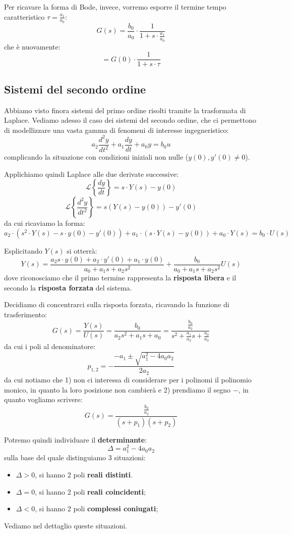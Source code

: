 \documentclass[a4paper,11pt]{article}
\begin{document}
Per ricavare la forma di Bode, invece, vorremo esporre il termine tempo caratteristico $\tau = \frac{a_1}{a_0}$:
$$
G(s) = \frac{b_0}{a_0} \cdot \frac{1}{1 + s \cdot \frac{a_1}{a_0}}
$$
che è nuovamente:
$$
= G(0) \cdot \frac{1}{1 + s \cdot \tau}
$$

\subsection{Sistemi del secondo ordine}
Abbiamo visto finora sistemi del primo ordine risolti tramite la trasformata di Laplace.
Vediamo adesso il caso dei sistemi del secondo ordine, che ci permettono di modellizzare una vasta gamma di fenomeni di interesse ingegneristico:
$$
a_2 \frac{d^2 y}{dt^2} + a_1 \frac{dy}{dt} + a_0 y = b_0 u
$$
complicando la situazione con condizioni iniziali non nulle ($y(0), y'(0) \neq 0$).

Applichiamo quindi Laplace alle due derivate successive:
$$
\mathcal{L} \left\{ \frac{dy}{dt} \right\} = s \cdot Y(s) - y(0)
$$
$$
\mathcal{L} \left\{ \frac{d^2y}{dt^2} \right\} = s \left( Y(s) - y(0) \right) - y'(0)
$$
da cui ricaviamo la forma:
$$
a_2 \cdot \left( s^2 \cdot Y(s) - s \cdot y(0) - y'(0) \right) + a_1 \cdot \left( s \cdot Y(s) - y(0) \right) + a_0 \cdot Y(s) = b_0 \cdot U(s)
$$

Esplicitando $Y(s)$ si otterrà:
$$
Y(s) = \frac{a_2 s \cdot y(0) + a_2 \cdot y'(0) + a_1 \cdot y(0)}{a_0 + a_1 s + a_2 s^2} + \frac{b_0}{a_0 + a_1 s + a_2 s^2} U(s) 
$$
dove riconosciamo che il primo termine rappresenta la \textbf{risposta libera} e il secondo la \textbf{risposta forzata} del sistema. 

Decidiamo di concentrarci sulla risposta forzata, ricavando la funzione di trasferimento:
$$
G(s) = \frac{Y(s)}{U(s)} = \frac{b_0}{a_2 s^2 + a_1 s + a_0} = \frac{ \frac{b_0}{a_2} }{s^2 + \frac{a_1}{a_2}s + \frac{a_0}{a_2}}
$$
da cui i poli al denominatore:
$$
p_{1, 2} = - \frac{-a_1 \pm \sqrt{a_1^2 - 4 a_0 a_2}}{2 a_2}
$$
da cui notiamo che 1) non ci interessa di considerare per i polinomi il polinomio monico, in quanto la loro posizione non cambierà e 2) prendiamo il segno $-$, in quanto vogliamo scrivere:
$$
G(s) = \frac{ \frac{b_0}{a_2} }{(s + p_1) (s + p_2)}
$$

Potremo quindi individuare il \textbf{determinante}:
$$
\Delta = a_1^2 - 4a_0a_2
$$
sulla base del quale distinguiamo 3 situazioni:
\begin{itemize}
	\item $\Delta > 0$, si hanno 2 poli \textbf{reali distinti}.
	\item $\Delta = 0$, si hanno 2 poli \textbf{reali coincidenti};
	\item $\Delta < 0$, si hanno 2 poli \textbf{complessi coniugati};
\end{itemize}
Vediamo nel dettaglio queste situazioni.
\end{document}
